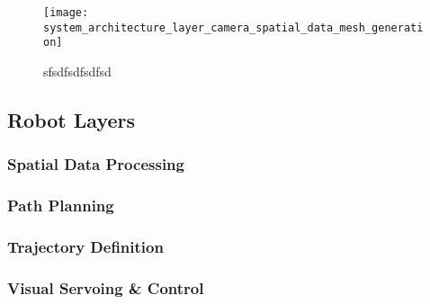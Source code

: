 \begin{figure}[htbp]
	\centering
	\texttt{[image: system\_architecture\_layer\_camera\_spatial\_data\_mesh\_generation]}
	\caption{sfsdfsdfsdfsd}
	\label{fig:system_architecture_layer_camera_spatial_data_mesh_generation}
\end{figure}



\subsection{Robot Layers}
\label{subsec:system_architectural_robot_layers}

\subsubsection*{Spatial Data Processing}
\label{subsubsec:system_architectural_robot_layers_spatial_data}


\subsubsection*{Path Planning}
\label{subsubsec:system_architectural_robot_layers_path_planning}


\subsubsection*{Trajectory Definition}
\label{subsubsec:system_architectural_robot_layers_trajectory_definition}


\subsubsection*{Visual Servoing \& Control}
\label{subsubsec:system_architectural_robot_layers_visual_servoing_control}




